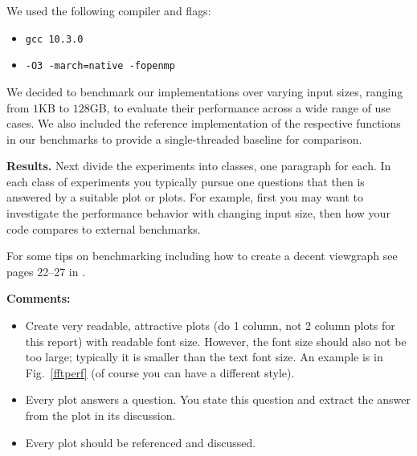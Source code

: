 \documentclass[letterpaper]{article}
\newcommand{\mypar}[1]{{\bf #1.}}
\begin{document}
We used the following compiler and flags:
\begin{itemize}
  \item \texttt{gcc 10.3.0}
  \item \texttt{-O3 -march=native -fopenmp}
\end{itemize}


We decided to benchmark our implementations over varying input sizes, ranging from $1$KB to $128$GB,
to evaluate their performance across a wide range of use cases.
We also included the reference implementation of the respective functions in our benchmarks to provide a single-threaded baseline for comparison.

\mypar{Results}
Next divide the experiments into classes, one paragraph for each. In each class of experiments you typically pursue one questions that then is answered by a suitable plot or plots. For example, first you may want to investigate the performance behavior with changing input size, then how your code compares to external benchmarks.

For some tips on benchmarking including how to create a decent viewgraph see pages 22--27 in \cite{Pueschel:10}.

{\bf Comments:}
\begin{itemize}
	\item Create very readable, attractive plots (do 1 column, not 2 column plots
	      for this report) with readable font size. However, the font size should also not be too large; typically it is smaller than the text font size.
	      An example is in Fig.~\ref{fftperf} (of course you can have a different style).
	\item Every plot answers a question. You state this question and extract the
	      answer from the plot in its discussion.
	\item Every plot should be referenced and discussed.
\end{itemize}
\end{document}
